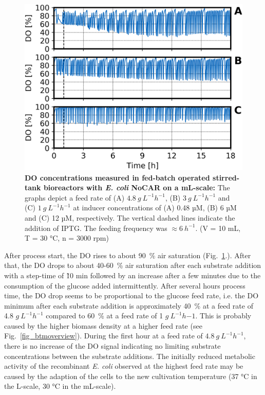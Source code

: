 \documentclass[sn-standardnature]{sn-jnl}%
\theoremstyle{thmstyleone}%
\theoremstyle{thmstyletwo}%
\theoremstyle{thmstylethree}%
\begin{document}
\begin{figure}[H]
    \centering
    \includegraphics[width=1.0\textwidth]{figures/O2_overview.png}
    \caption{
        \textbf{DO concentrations measured in fed-batch operated stirred-tank bioreactors with \textit{E. coli} NoCAR on a mL-scale:}
        The graphs depict a feed rate of (A) $4.8\ g\ L^{-1} h^{-1}$, (B) $3\ g\ L^{-1} h^{-1}$ and (C) $1\ g\ L^{-1} h^{-1}$ at inducer concentrations of (A) 0.48 µM, (B) 6 µM and (C) 12 µM, respectively.
        The vertical dashed lines indicate the addition of IPTG.
        The feeding frequency was $\approx 6\ h^{-1}$.
        (V = 10 mL, T = 30 °C, n = 3000 rpm)
    }
    \label{fig_o2overview}
\end{figure}


After process start, the DO rises to about 90~\% air saturation (Fig.~\ref{fig_o2overview}.).
After that, the DO drops to about 40-60~\% air saturation after each substrate addition with a step-time of \~10 min followed by an increase after a few minutes due to the consumption of the glucose added intermittently.
After several hours process time, the DO drop seems to be proportional to the glucose feed rate, i.e. the DO minimum after each substrate addition is approximately 40~\% at a feed rate of 4.8 $ g\ L^{-1} h^{-1}$ compared to 60~\% at a feed rate of 1 $ g\ L^{-1} h{-1}$.
This is probably caused by the higher biomass density at a higher feed rate (see Fig.~\ref{fig_btmoverview}).
During the first hour at a feed rate of $4.8\ g\ L^{-1} h^{-1}$, there is no increase of the DO signal indicating no limiting substrate concentrations between the substrate additions.
The initially reduced metabolic activity of the recombinant \textit{E. coli} observed at the highest feed rate may be caused by the adaption of the cells to the new cultivation temperature (37 °C in the L-scale, 30 °C in the mL-scale).
\end{document}
